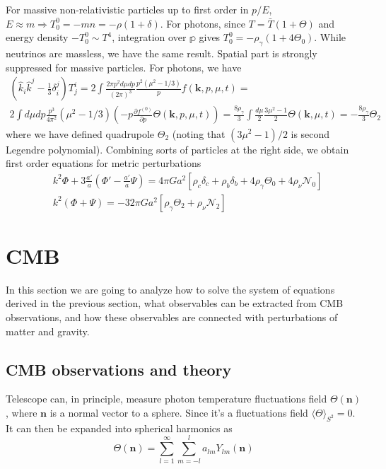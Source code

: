 \documentclass[12pt]{extarticle}
\numberwithin{problem}{section}
\numberwithin{theorem}{section}
\begin{document}
	For massive non-relativistic particles up to first order in $p/E$, $E\approx m\Rightarrow T^0_0 = -mn = -\rho(1 + \delta)$. For photons, since $T = \bar{T}(1 + \Theta)$ and energy density $-T^0_0\sim T^4$, integration over $\mathbb{p}$ gives $T^0_0 = -\rho_\gamma(1 + 4\Theta_0)$. While neutrinos are massless, we have the same result. Spatial part is strongly suppressed for massive particles. For photons, we have
	\begin{multline}
		(\hat{k}_i\hat{k}^j - \frac{1}{3}\delta_i^j)T^i_j = 2\int\frac{2\pi p^2 d\mu dp}{(2\pi)^3}\frac{p^2(\mu^2 - 1/3)}{p}f(\mathbf{k}, p, \mu, t) =\\
		2\int d\mu dp\frac{p^3}{4\pi^2}(\mu^2 - 1/3)\left(-p\frac{\partial f^{(0)}}{\partial p}\Theta(\mathbf{k}, p, \mu, t)\right) = \frac{8\rho_\gamma}{3}\int \frac{d\mu}{2} \frac{3\mu^2 - 1}{2}\Theta(\mathbf{k}, \mu, t) = -\frac{8\rho_\gamma}{3}\Theta_2
	\end{multline}
	where we have defined quadrupole $\Theta_2$ (noting that $(3\mu^2 - 1) / 2$ is second Legendre polynomial). Combining sorts of particles at the right side, we obtain first order equations for metric perturbations
	\begin{align}
		& k^2\Phi + 3\frac{a'}{a}\left(\Phi' - \frac{a'}{a}\Psi\right) = 4\pi Ga^2[\rho_c\delta_c + \rho_b\delta_b + 4\rho_\gamma\Theta_0 + 4\rho_\nu\mathcal{N}_0] \\
		& k^2(\Phi + \Psi) = -32\pi Ga^2[\rho_\gamma\Theta_2 + \rho_\nu\mathcal{N}_2]
	\end{align}

	\section{CMB}
	In this section we are going to analyze how to solve the system of equations derived in the previous section, what observables can be extracted from CMB observations, and how these observables are connected with perturbations of matter and gravity.
	
	\subsection{CMB observations and theory}
	Telescope can, in principle, measure photon temperature fluctuations field $\Theta(\mathbf{n})$, where $\mathbf{n}$ is a normal vector to a sphere. Since it's a fluctuations field $\langle\Theta\rangle_{S^2} = 0$. It can then be expanded into spherical harmonics as 
	\begin{equation}
		\Theta(\mathbf{n}) = \sum_{l=1}^\infty\sum_{m=-l}^l a_{lm}Y_{lm}(\mathbf{n})
	\end{equation}
	
\end{document}

